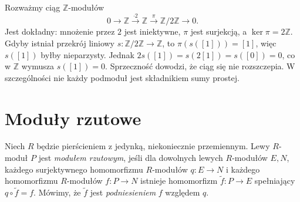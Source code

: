 \begin{przyklad}
\label{aa:prz:modules-nonsplit-z}
Rozważmy ciąg $\mathbb Z$-modułów
\[
0\longrightarrow\mathbb Z\xrightarrow{\cdot2}\mathbb Z
 \xrightarrow{\pi}\mathbb Z/2\mathbb Z\longrightarrow0.
\]
Jest dokładny: mnożenie przez $2$ jest iniektywne,
$\pi$ jest surjekcją, a $\ker\pi=2\mathbb Z$.
Gdyby istniał przekrój liniowy
$s:\mathbb Z/2\mathbb Z\to\mathbb Z$, to
$\pi(s([1]))=[1]$, więc $s([1])$ byłby nieparzysty.
Jednak $2s([1])=s(2[1])=s([0])=0$,
co w $\mathbb Z$ wymusza $s([1])=0$.
Sprzeczność dowodzi, że ciąg się nie rozszczepia.
W szczególności nie każdy podmoduł jest
składnikiem sumy prostej.
\end{przyklad}

\section{Moduły rzutowe}
\begin{definicja}
\label{aa:def:modules-projective}
Niech $R$ będzie pierścieniem z jedynką,
niekoniecznie przemiennym. Lewy $R$-moduł $P$ jest
\emph{modułem rzutowym}, jeśli dla dowolnych lewych
$R$-modułów $E,N$, każdego surjektywnego homomorfizmu
$R$-modułów $q:E\to N$ i każdego homomorfizmu
$R$-modułów $f:P\to N$
istnieje homomorfizm $\widetilde f:P\to E$
spełniający $q\circ\widetilde f=f$.
Mówimy, że $\widetilde f$ jest \emph{podniesieniem}
$f$ względem $q$.
\end{definicja}

